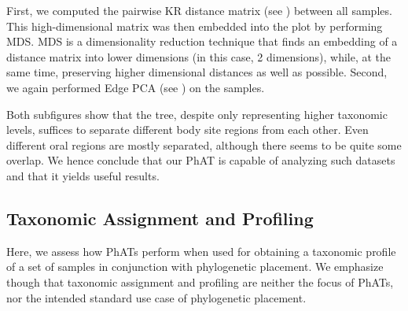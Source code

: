 
First, we computed the pairwise KR distance matrix
(see ) between all samples.
This high-dimensional matrix was then embedded into the plot by performing \acf{MDS}.
\ac{MDS} \citep{Mardia1978,Krzanowski1994,Everitt2010} is a dimensionality reduction technique that
finds an embedding of a distance matrix into lower dimensions (in this case, \num{2} dimensions),
while, at the same time, preserving higher dimensional distances as well as possible.
Second, we again performed Edge PCA \citep{Matsen2011a}
(see ) on the samples.

Both subfigures show that the tree, despite only representing higher taxonomic levels,
suffices to separate different body site regions from each other.
Even different oral regions are mostly separated, although there seems to be quite some overlap.
We hence conclude that our \ac{PhAT} is capable of analyzing such datasets and that it yields useful results.


\subsection{Taxonomic Assignment and Profiling}
\label{ch:AutomaticTrees:sec:Evaluation:sub:TaxonomicAssignmentProfiling}

Here, we assess how \acp{PhAT} perform when used
for obtaining a taxonomic profile of a set of samples in conjunction with phylogenetic placement.
We emphasize though that taxonomic assignment and profiling are neither the focus of \acp{PhAT},
nor the intended standard use case of phylogenetic placement.

